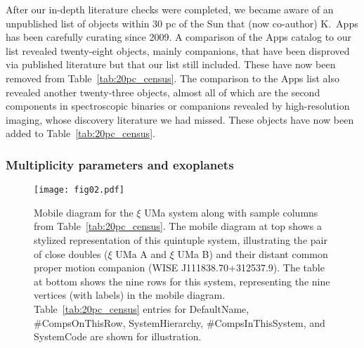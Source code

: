 \documentclass[twocolumn,tighten,twocolappendix]{aastex631}
\begin{document}
After our in-depth literature checks were completed, we became aware of an unpublished list of objects within 30 pc of the Sun that (now co-author) K.\ Apps has been carefully curating since 2009. A comparison of the Apps catalog to our list revealed twenty-eight objects, mainly companions, that have been disproved via published literature but that our list still included. These have now been removed from Table~\ref{tab:20pc_census}. The comparison to the Apps list also revealed another twenty-three objects, almost all of which are the second components in spectroscopic binaries or companions revealed by high-resolution imaging, whose discovery literature we had missed. These objects have now been added to Table~\ref{tab:20pc_census}.

\subsubsection{Multiplicity parameters and exoplanets\label{sec:multiplicity_and_exoplanets}}

\begin{figure*}
\texttt{[image: fig02.pdf]}
\caption{Mobile diagram for the $\xi$ UMa system along with sample columns from Table~\ref{tab:20pc_census}. The mobile diagram at top shows a stylized representation of this quintuple system, illustrating the pair of close doubles ($\xi$ UMa A and $\xi$ UMa B) and their distant common proper motion companion (WISE J111838.70+312537.9). The table at bottom shows the nine rows for this system, representing the nine vertices (with labels) in the mobile diagram. Table~\ref{tab:20pc_census} entries for DefaultName, \#CompsOnThisRow, SystemHierarchy, \#CompsInThisSystem, and SystemCode are shown for illustration.
\label{fig:mobile_diagram}}
\end{figure*}
\end{document}
